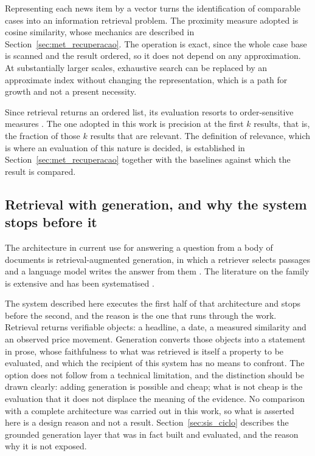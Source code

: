 Representing each news item by a vector turns the identification of comparable cases into an
information retrieval problem. The proximity measure adopted is cosine similarity, whose mechanics
are described in Section~\ref{sec:met_recuperacao}. The operation is exact, since the whole case
base is scanned and the result ordered, so it does not depend on any approximation. At
substantially larger scales, exhaustive search can be replaced by an approximate index
\autocite{johnson2021faiss} without changing the representation, which is a path for growth and not
a present necessity.

Since retrieval returns an ordered list, its evaluation resorts to order-sensitive measures
\autocite{manning2008ir}. The one adopted in this work is precision at the first $k$ results, that
is, the fraction of those $k$ results that are relevant. The definition of relevance, which is
where an evaluation of this nature is decided, is established in Section~\ref{sec:met_recuperacao}
together with the baselines against which the result is compared.

\subsection{Retrieval with generation, and why the system stops before it}
\label{sec:ctx_rag}

The architecture in current use for answering a question from a body of documents is
retrieval-augmented generation, in which a retriever selects passages and a language model writes
the answer from them \autocite{lewis2020rag}. The literature on the family is extensive and has
been systematised \autocite{huang2026ragsurvey}.

The system described here executes the first half of that architecture and stops before the second,
and the reason is the one that runs through the work. Retrieval returns verifiable objects: a
headline, a date, a measured similarity and an observed price movement. Generation converts those
objects into a statement in prose, whose faithfulness to what was retrieved is itself a property to
be evaluated, and which the recipient of this system has no means to confront. The option does not
follow from a technical limitation, and the distinction should be drawn clearly: adding generation
is possible and cheap; what is not cheap is the evaluation that it does not displace the meaning of
the evidence. No comparison with a complete architecture was carried out in this work, so what is
asserted here is a design reason and not a result. Section~\ref{sec:sis_ciclo} describes the
grounded generation layer that was in fact built and evaluated, and the reason why it is not
exposed.

